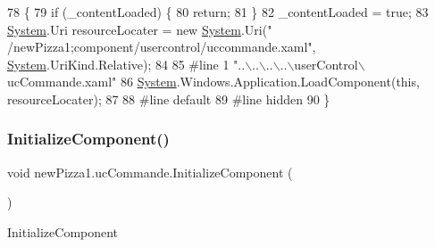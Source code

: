 \begin{DoxyCode}
78                                           \{
79             \textcolor{keywordflow}{if} (\_contentLoaded) \{
80                 \textcolor{keywordflow}{return};
81             \}
82             \_contentLoaded = \textcolor{keyword}{true};
83             \hyperlink{namespaceSystem}{System}.Uri resourceLocater = \textcolor{keyword}{new} \hyperlink{namespaceSystem}{System}.Uri(\textcolor{stringliteral}{"
      /newPizza1;component/usercontrol/uccommande.xaml"}, \hyperlink{namespaceSystem}{System}.UriKind.Relative);
84             
85 \textcolor{preprocessor}{            #line 1 "..\(\backslash\)..\(\backslash\)..\(\backslash\)..\(\backslash\)userControl\(\backslash\)ucCommande.xaml"
}
86             \hyperlink{namespaceSystem}{System}.Windows.Application.LoadComponent(\textcolor{keyword}{this}, resourceLocater);
87             
88 \textcolor{preprocessor}{            #line default
}
89 \textcolor{preprocessor}{            #line hidden
}
90         \}
\end{DoxyCode}
\mbox{\label{classnewPizza1_1_1ucCommande_a3f6251cc87dd9f2a2db45c5413ce1711}} 
\subsubsection{\texorpdfstring{Initialize\+Component()}{InitializeComponent()}\hspace{0.1cm}{\footnotesize\ttfamily [4/6]}}
{\footnotesize\ttfamily void new\+Pizza1.\+uc\+Commande.\+Initialize\+Component (\begin{DoxyParamCaption}{ }\end{DoxyParamCaption})\hspace{0.3cm}{\ttfamily [inline]}}



Initialize\+Component 


